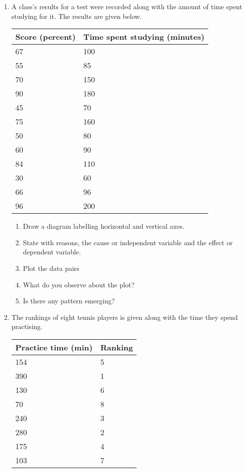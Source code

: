 
{
\begin{enumerate}
\item A class's results for a test were recorded along with the amount of time spent studying for it. The results are given below.
\begin{center}
\begin{tabular}{|l|l|}
\hline
Score (percent) & Time spent studying (minutes)  \\ 
\hline
67 & 100  \\
55 & 85  \\
70 & 150  \\
90 & 180  \\
45 & 70  \\
75 & 160  \\
50 & 80  \\
60 & 90  \\
84 & 110  \\
30 & 60  \\
66 & 96  \\
96 & 200  \\
\hline
\end{tabular}
\end{center}

	\begin{enumerate}
	\item Draw a diagram labelling horizontal and vertical axes. 
	\item State with reasons, the cause or independent variable and the effect or dependent variable.
	\item Plot the data pairs
	\item What do you observe about the plot?
	\item Is there any pattern emerging? 
	\end{enumerate}
\item The rankings of eight tennis players is given along with the time they spend practising.

\begin{center}
\begin{tabular}{|l|l|}
\hline
Practice time (min) & Ranking  \\ 
\hline
154 & 5 \\
390 & 1 \\
130 & 6 \\
70  & 8 \\
240 & 3 \\
280 & 2 \\
175 & 4 \\
103 & 7 \\
\hline
\end{tabular}
\end{center}


\end{enumerate}}
